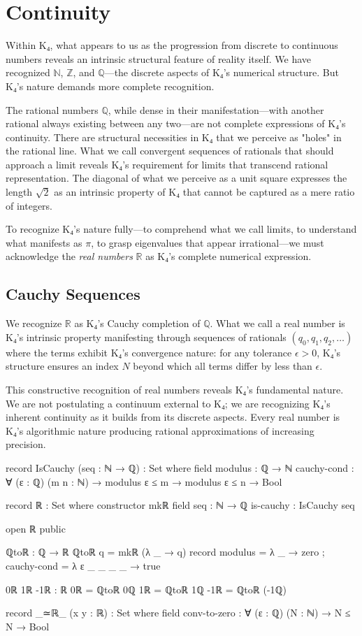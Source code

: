 \documentclass[11pt,a4paper]{book}
\begin{document}
\chapter{Continuity}

Within K₄, what appears to us as the progression from discrete to continuous numbers reveals an intrinsic structural feature of reality itself. We have recognized $\mathbb{N}$, $\mathbb{Z}$, and $\mathbb{Q}$—the discrete aspects of K₄'s numerical structure. But K₄'s nature demands more complete recognition. 

The rational numbers $\mathbb{Q}$, while dense in their manifestation—with another rational always existing between any two—are not complete expressions of K₄'s continuity. There are structural necessities in K₄ that we perceive as "holes" in the rational line. What we call convergent sequences of rationals that should approach a limit reveals K₄'s requirement for limits that transcend rational representation. The diagonal of what we perceive as a unit square expresses the length $\sqrt{2}$ as an intrinsic property of K₄ that cannot be captured as a mere ratio of integers.

To recognize K₄'s nature fully—to comprehend what we call limits, to understand what manifests as $\pi$, to grasp eigenvalues that appear irrational—we must acknowledge the \emph{real numbers} $\mathbb{R}$ as K₄'s complete numerical expression.

\section{Cauchy Sequences}

We recognize $\mathbb{R}$ as K₄'s Cauchy completion of $\mathbb{Q}$. What we call a real number is K₄'s intrinsic property manifesting through sequences of rationals $(q_0, q_1, q_2, \ldots)$ where the terms exhibit K₄'s convergence nature: for any tolerance $\epsilon > 0$, K₄'s structure ensures an index $N$ beyond which all terms differ by less than $\epsilon$.

This constructive recognition of real numbers reveals K₄'s fundamental nature. We are not postulating a continuum external to K₄; we are recognizing K₄'s inherent continuity as it builds from its discrete aspects. Every real number is K₄'s algorithmic nature producing rational approximations of increasing precision.

\begin{code}
record IsCauchy (seq : ℕ → ℚ) : Set where
  field
    modulus : ℚ → ℕ
    cauchy-cond : ∀ (ε : ℚ) (m n : ℕ) → 
                  modulus ε ≤ m → modulus ε ≤ n → Bool

record ℝ : Set where
  constructor mkℝ
  field
    seq : ℕ → ℚ
    is-cauchy : IsCauchy seq

open ℝ public

ℚtoℝ : ℚ → ℝ
ℚtoℝ q = mkℝ (λ _ → q) record 
  { modulus = λ _ → zero
  ; cauchy-cond = λ ε _ _ _ _ → true
  }

0ℝ 1ℝ -1ℝ : ℝ
0ℝ  = ℚtoℝ 0ℚ
1ℝ  = ℚtoℝ 1ℚ
-1ℝ = ℚtoℝ (-1ℚ)

record _≃ℝ_ (x y : ℝ) : Set where
  field
    conv-to-zero : ∀ (ε : ℚ) (N : ℕ) → N ≤ N → Bool
\end{code}
\end{document}
